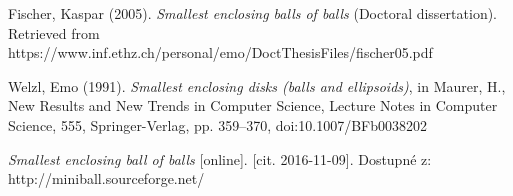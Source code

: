 \begin{thebibliography}{10}

Fischer, Kaspar (2005).
\textit{Smallest enclosing balls of balls} (Doctoral dissertation).
Retrieved from https://www.inf.ethz.ch/personal/emo/DoctThesisFiles/fischer05.pdf

Welzl, Emo (1991). \textit{Smallest enclosing disks (balls and ellipsoids)},
in Maurer, H., New Results and New Trends in Computer Science, Lecture Notes in Computer Science,
555, Springer-Verlag, pp. 359–370, doi:10.1007/BFb0038202

\textit{Smallest enclosing ball of balls} [online]. [cit. 2016-11-09]. Dostupné z: http://miniball.sourceforge.net/

\end{thebibliography}

\cleardoublepage
